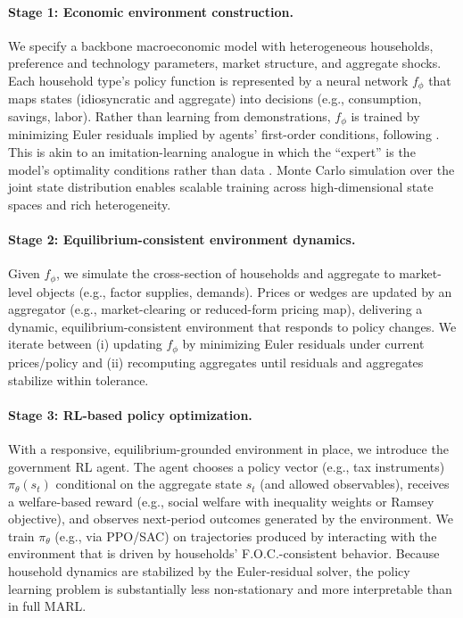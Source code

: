\documentclass[11pt]{article}
\begin{document}
\paragraph{Stage 1: Economic environment construction.}
We specify a backbone macroeconomic model with heterogeneous households, preference and technology parameters, market structure, and aggregate shocks. Each household type’s policy function is represented by a neural network $f_{\phi}$ that maps states (idiosyncratic and aggregate) into decisions (e.g., consumption, savings, labor). Rather than learning from demonstrations, $f_{\phi}$ is trained by minimizing Euler residuals implied by agents’ first-order conditions, following \cite{maliar2021deep}. This is akin to an imitation-learning analogue in which the ``expert'' is the model’s optimality conditions rather than data \cite{ho2016generative}. Monte Carlo simulation over the joint state distribution enables scalable training across high-dimensional state spaces and rich heterogeneity.

\paragraph{Stage 2: Equilibrium-consistent environment dynamics.}
Given $f_{\phi}$, we simulate the cross-section of households and aggregate to market-level objects (e.g., factor supplies, demands). Prices or wedges are updated by an aggregator (e.g., market-clearing or reduced-form pricing map), delivering a dynamic, equilibrium-consistent environment that responds to policy changes. We iterate between (i) updating $f_{\phi}$ by minimizing Euler residuals under current prices/policy and (ii) recomputing aggregates until residuals and aggregates stabilize within tolerance.

\paragraph{Stage 3: RL-based policy optimization.}
With a responsive, equilibrium-grounded environment in place, we introduce the government RL agent. The agent chooses a policy vector (e.g., tax instruments) $\pi_{\theta}(s_t)$ conditional on the aggregate state $s_t$ (and allowed observables), receives a welfare-based reward (e.g., social welfare with inequality weights or Ramsey objective), and observes next-period outcomes generated by the environment. We train $\pi_{\theta}$ (e.g., via PPO/SAC) on trajectories produced by interacting with the environment that is driven by households’ F.O.C.-consistent behavior. Because household dynamics are stabilized by the Euler-residual solver, the policy learning problem is substantially less non-stationary and more interpretable than in full MARL.
\end{document}
